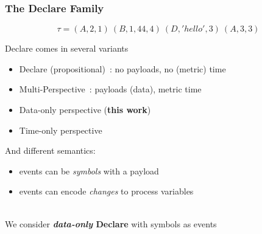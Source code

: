 \documentclass[xcolor=dvipsnames]{beamer}
\begin{document}
\begin{frame}
\frametitle{The Declare Family}

	$$\tau=(A,2,1)~(B,1,44,4)~(D,'hello',3)~(A,3,3)$$ 

Declare comes in several variants

\begin{itemize}
	\item Declare (propositional)~\cite{}: no payloads, no (metric) time
	\item Multi-Perspective~\cite{mp-declare}: payloads (data), metric time
	\item Data-only perspective ({\bf this work})
	\item Time-only perspective
\end{itemize}

And different semantics:
\begin{itemize}
	\item events can be \emph{symbols} with a payload
	\item events can encode \emph{changes} to process variables
\end{itemize}

~\\

We consider {\bf \emph{data-only} Declare} with symbols as events

\end{frame}

\end{document}
